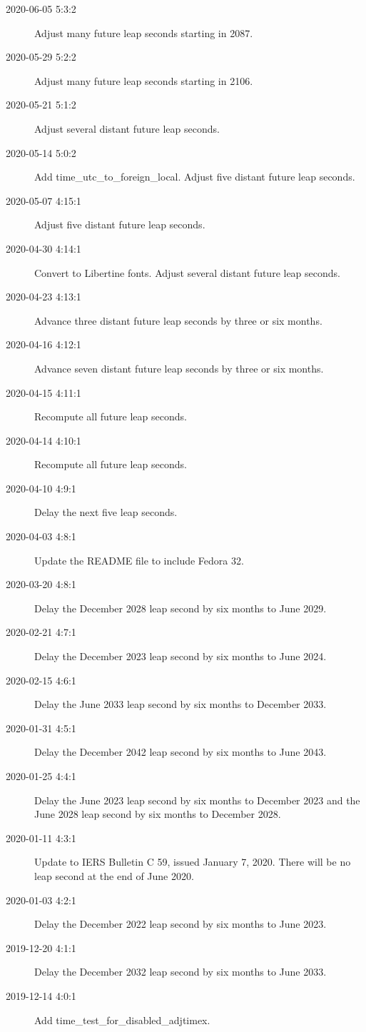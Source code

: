 \documentclass[letterpaper,twoside]{article}
\begin{document}
\begin{description}
\item[2020-06-05 5:3:2]Adjust many future leap seconds starting in 2087.
\item[2020-05-29 5:2:2]Adjust many future leap seconds starting in 2106.
\item[2020-05-21 5:1:2]Adjust several distant future leap seconds.
\item[2020-05-14 5:0:2]Add time\_utc\_to\_foreign\_local.
  Adjust five distant future leap seconds.
\item[2020-05-07 4:15:1]Adjust five distant future leap seconds.
\item[2020-04-30 4:14:1]Convert to Libertine fonts.  Adjust several distant
  future leap seconds.
\item[2020-04-23 4:13:1]Advance three distant future leap seconds
  by three or six months.
\item[2020-04-16 4:12:1]Advance seven distant future leap seconds
  by three or six months.
\item[2020-04-15 4:11:1]Recompute all future leap seconds.
\item[2020-04-14 4:10:1]Recompute all future leap seconds.
\item[2020-04-10 4:9:1]Delay the next five leap seconds.
\item[2020-04-03 4:8:1]Update the README file to include Fedora 32.
\item[2020-03-20 4:8:1]Delay the December 2028 leap second by six months
  to June 2029.
\item[2020-02-21 4:7:1]Delay the December 2023 leap second by six months
  to June 2024.
\item[2020-02-15 4:6:1]Delay the June 2033 leap second by six months
  to December 2033.
\item[2020-01-31 4:5:1]Delay the December 2042 leap second by six months
  to June 2043.
\item[2020-01-25 4:4:1]Delay the June 2023 leap second by six months
  to December 2023 and the June 2028 leap second by six months to December 2028.
\item[2020-01-11 4:3:1]Update to IERS Bulletin C 59, issued January 7, 2020.
  There will be no leap second at the end of June 2020.
\item[2020-01-03 4:2:1]Delay the December 2022 leap second by six months
  to June 2023.
\item[2019-12-20 4:1:1]Delay the December 2032 leap second by six months
  to June 2033.
\item[2019-12-14 4:0:1]Add {\ttfamily time\_test\_for\_disabled\_adjtimex}.

\end{description}
\end{document}
